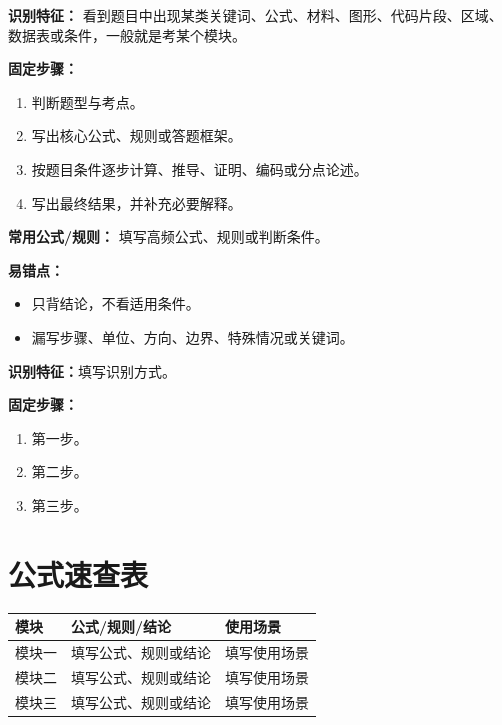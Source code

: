 \documentclass[UTF8,zihao=-4]{ctexart}
\begin{document}
\begin{methodbox}
\textbf{识别特征：}
看到题目中出现某类关键词、公式、材料、图形、代码片段、区域、数据表或条件，一般就是考某个模块。\par

\textbf{固定步骤：}
\begin{enumerate}
  \item 判断题型与考点。
  \item 写出核心公式、规则或答题框架。
  \item 按题目条件逐步计算、推导、证明、编码或分点论述。
  \item 写出最终结果，并补充必要解释。
\end{enumerate}

\textbf{常用公式/规则：}
填写高频公式、规则或判断条件。\par

\textbf{易错点：}
\begin{itemize}
  \item 只背结论，不看适用条件。
  \item 漏写步骤、单位、方向、边界、特殊情况或关键词。
\end{itemize}
\end{methodbox}

\begin{methodbox}
\textbf{识别特征：}填写识别方式。\par
\textbf{固定步骤：}
\begin{enumerate}
  \item 第一步。
  \item 第二步。
  \item 第三步。
\end{enumerate}
\end{methodbox}

\section{公式速查表}

\begin{longtable}{p{}p{}p{}}
\toprule
\textbf{模块} & \textbf{公式/规则/结论} & \textbf{使用场景} \\
\midrule
模块一 & 填写公式、规则或结论 & 填写使用场景 \\
模块二 & 填写公式、规则或结论 & 填写使用场景 \\
模块三 & 填写公式、规则或结论 & 填写使用场景 \\
\bottomrule
\end{longtable}
\end{document}
